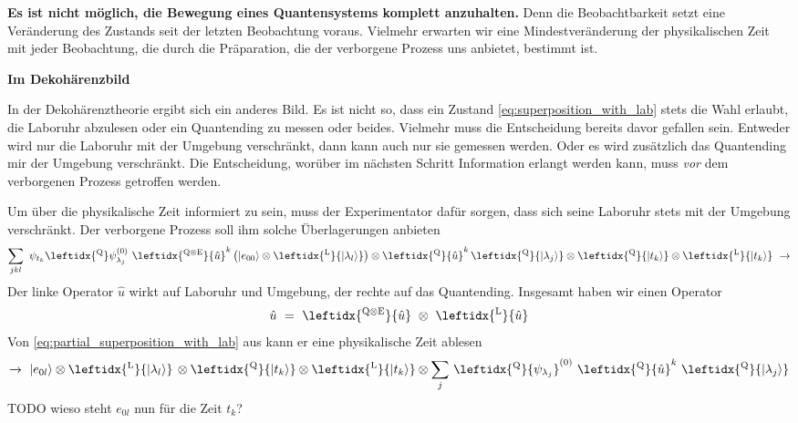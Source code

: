 \documentclass[12pt]{article}
\begin{document}
\textbf{Es ist nicht möglich, die Bewegung eines Quantensystems komplett anzuhalten.} Denn die Beobachtbarkeit setzt eine Veränderung des Zustands seit der letzten Beobachtung voraus. Vielmehr erwarten wir eine Mindestveränderung der physikalischen Zeit mit jeder Beobachtung, die durch die Präparation, die der verborgene Prozess uns anbietet, bestimmt ist.

\textbf{Im Dekohärenzbild} 

In der Dekohärenztheorie ergibt sich ein anderes Bild. Es ist nicht so, dass ein Zustand \eqref{eq:superposition_with_lab} stets die Wahl erlaubt, die Laboruhr abzulesen oder ein Quantending zu messen oder beides. Vielmehr muss die Entscheidung bereits davor gefallen sein. Entweder wird nur die Laboruhr mit der Umgebung verschränkt, dann kann auch nur sie gemessen werden. Oder es wird zusätzlich das Quantending mir der Umgebung verschränkt. Die Entscheidung, worüber im nächsten Schritt Information erlangt werden kann, muss \emph{vor} dem verborgenen Prozess getroffen werden.

Um über die physikalische Zeit informiert zu sein, muss der Experimentator dafür sorgen, dass sich seine Laboruhr stets mit der Umgebung verschränkt. Der verborgene Prozess soll ihm solche Überlagerungen anbieten
\begin{equation}
\label{eq:partial_superposition_with_lab}
\sum_{jkl} \ \psi_{t_k} \leftidx{^\mathrm{Q}}\psi_{\lambda_j}^{(0)}\ 
\leftidx{^\mathrm{Q \otimes E}}{\hat{u}}^k \left( \ket{e_{00}} \otimes \leftidx{^\mathrm{L}}{\ket{\lambda_l}} \right) 
\otimes \leftidx{^\mathrm{Q}}{\hat{u}}^{k}\, \leftidx{^\mathrm{Q}}{\ket{\lambda_j}}
\otimes \leftidx{^\mathrm{Q}}{\ket{t_k}}
\otimes \leftidx{^\mathrm{L}}{\ket{t_k}}
\ \xrightarrow{}
\end{equation}
Der linke Operator $\hat{u}$ wirkt auf Laboruhr und Umgebung, der rechte auf das Quantending. Insgesamt haben wir einen Operator
\begin{equation}
\label{eq:unitary_2_parts}
\hat{u}\ =\ \leftidx{^\mathrm{Q \otimes E}}{\hat{u}}\ \otimes\ \leftidx{^\mathrm{L}}{\hat{u}}
\end{equation}
Von \eqref{eq:partial_superposition_with_lab} aus kann er eine physikalische Zeit ablesen
\begin{equation*}
\xrightarrow{} \ \ket{e_{0l}} 
\otimes \leftidx{^\mathrm{L}}{\ket{\lambda_l}} \,
\otimes \leftidx{^\mathrm{Q}}{\ket{t_k}}
\otimes \leftidx{^\mathrm{L}}{\ket{t_k}}
\otimes \sum_{j} \, \leftidx{^\mathrm{Q}}{\psi_{\lambda_j}}^{(0)}\ 
\leftidx{^\mathrm{Q}}{\hat{u}}^{k}\ 
\leftidx{^\mathrm{Q}}{\ket{\lambda_j}}
\end{equation*}
TODO wieso steht $e_{0l}$ nun für die Zeit $t_k$?
\end{document}

